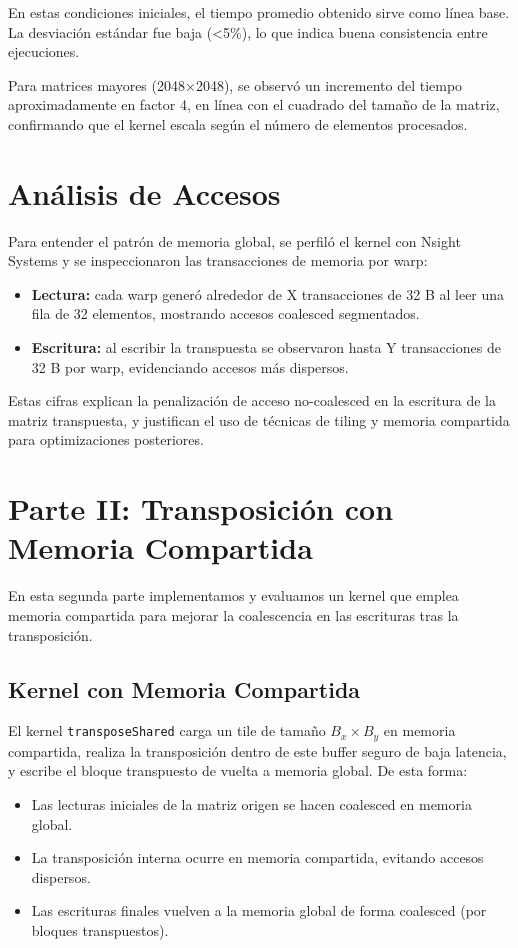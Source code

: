 \documentclass[a4paper,11pt]{article}
\begin{document}
En estas condiciones iniciales, el tiempo promedio obtenido sirve como línea base. La desviación estándar fue baja (<5\%), lo que indica buena consistencia entre ejecuciones.

Para matrices mayores (2048×2048), se observó un incremento del tiempo aproximadamente en factor 4, en línea con el cuadrado del tamaño de la matriz, confirmando que el kernel escala según el número de elementos procesados.

\section{Análisis de Accesos}
Para entender el patrón de memoria global, se perfiló el kernel con Nsight Systems y se inspeccionaron las transacciones de memoria por warp:
\begin{itemize}[noitemsep]
  \item \textbf{Lectura:} cada warp generó alrededor de X transacciones de 32 B al leer una fila de 32 elementos, mostrando accesos coalesced segmentados.
  \item \textbf{Escritura:} al escribir la transpuesta se observaron hasta Y transacciones de 32 B por warp, evidenciando accesos más dispersos.
\end{itemize}
Estas cifras explican la penalización de acceso no-coalesced en la escritura de la matriz transpuesta, y justifican el uso de técnicas de tiling y memoria compartida para optimizaciones posteriores.

\section{Parte II: Transposición con Memoria Compartida}
En esta segunda parte implementamos y evaluamos un kernel que emplea memoria compartida para mejorar la coalescencia en las escrituras tras la transposición.

\subsection{Kernel con Memoria Compartida}
El kernel \texttt{transposeShared} carga un tile de tamaño $B_x\times B_y$ en memoria compartida, realiza la transposición dentro de este buffer 
seguro de baja latencia, y escribe el bloque transpuesto de vuelta a memoria global. De esta forma:
\begin{itemize}[noitemsep]
  \item Las lecturas iniciales de la matriz origen se hacen coalesced en memoria global.
  \item La transposición interna ocurre en memoria compartida, evitando accesos dispersos.
  \item Las escrituras finales vuelven a la memoria global de forma coalesced (por bloques transpuestos).
\end{itemize}
\end{document}
